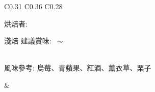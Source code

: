 \documentclass[10pt,a4paper]{article}
\begin{document}
\begin{tabular}{C{0.31\textwidth} C{0.36\textwidth} C{0.28\textwidth}}
{{烘焙者: \textbf{\scriptsize{}}}\vspace*{-0.3em}\\
 \addtocounter{datenumber}{
6 }%
\setdatebynumber{\thedatenumber} 
{\normalsize 
淺焙%
\enskip \scriptsize 建議賞味:} \scriptsize{\datemonthname ~\thedateday}$\thicksim$\addtocounter{datenumber}{55}\setdatebynumber{\thedatenumber} \datedate
\\\scriptsize 風味參考: 烏莓、青蘋果、紅酒、薰衣草、栗子
}& \shortstack[c]{
%
%
\hspace*{1.3cm} { \vspace*{-0.68cm}\Large 
}}
\end{tabular}
\end{document}
